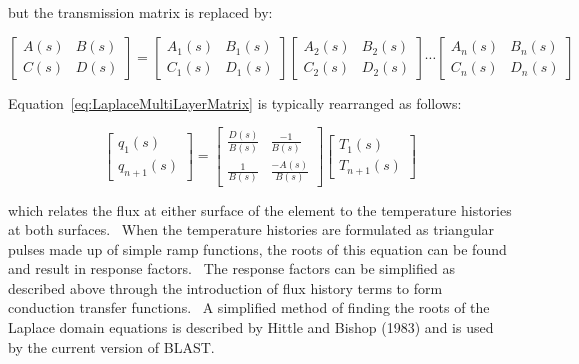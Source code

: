 but the transmission matrix is replaced by:

\begin{equation}
\left[ {\begin{array}{ccc}{A\left( s \right)}&{B\left( s \right)}\\ {C\left( s \right)}&{D\left( s \right)}\end{array}} \right] = \left[ {\begin{array}{ccc}{{A_1}\left( s \right)}&{{B_1}\left( s \right)}\\ {{C_1}\left( s \right)}&{{D_1}\left( s \right)}\end{array}} \right]\left[ {\begin{array}{ccc}{{A_2}\left( s \right)}&{{B_2}\left( s \right)}\\ {{C_2}\left( s \right)}&{{D_2}\left( s \right)}\end{array}} \right] \cdots \left[ {\begin{array}{ccc}{{A_n}\left( s \right)}&{{B_n}\left( s \right)}\\ {{C_n}\left( s \right)}&{{D_n}\left( s \right)}\end{array}} \right]
\end{equation}

Equation~\ref{eq:LaplaceMultiLayerMatrix} is typically rearranged as follows:

\begin{equation}
\left[ {\begin{array}{ccc}{{q_1}\left( s \right)}\\ {{q_{n + 1}}\left( s \right)}\end{array}} \right] = \left[ {\begin{array}{ccc}{\frac{{D\left( s \right)}}{{B\left( s \right)}}}&{\frac{{ - 1}}{{B\left( s \right)}}}\\ {\frac{1}{{B\left( s \right)}}}&{\frac{{ - A\left( s \right)}}{{B\left( s \right)}}}\end{array}} \right]\left[ {\begin{array}{ccc}{{T_1}\left( s \right)}\\ {{T_{n + 1}}\left( s \right)}\end{array}} \right]
\label{eq:LaplaceTransformDeriv631}
\end{equation}

which relates the flux at either surface of the element to the temperature histories at both surfaces.~ When the temperature histories are formulated as triangular pulses made up of simple ramp functions, the roots of this equation can be found and result in response factors.~ The response factors can be simplified as described above through the introduction of flux history terms to form conduction transfer functions.~ A simplified method of finding the roots of the Laplace domain equations is described by Hittle and Bishop (1983) and is used by the current version of BLAST.

